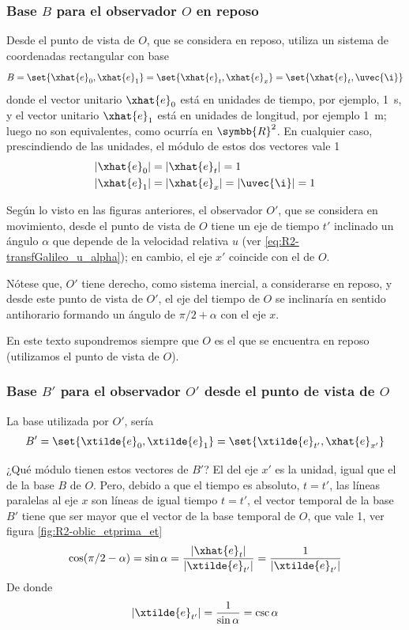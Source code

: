 \subsubsection{Base $B$ para el observador $O$ en reposo}
Desde el punto de vista de $O$, que se considera en reposo, utiliza un sistema de
coordenadas rectangular con base
\begin{equation}
  B
  = \set{\xhat{e}_0, \xhat{e}_1}
  = \set{\xhat{e}_t, \xhat{e}_x}
  = \set{\xhat{e}_t, \uvec{\i}}
\end{equation}
donde el vector unitario $\xhat{e}_0$ está en unidades de tiempo, por ejemplo,
\qty{1}{\second}, y el vector unitario $\xhat{e}_1$ está en unidades de longitud, por
ejemplo \qty{1}{\metre}; luego no son equivalentes, como ocurría en $\symbb{R}^2$.
En cualquier caso, prescindiendo de las unidades, el módulo de estos dos vectores vale 1
\begin{subequations}
\begin{align}
  |\xhat{e}_0| &= |\xhat{e}_t| = 1\\
  |\xhat{e}_1| &= |\xhat{e}_x| = |\uvec{\i}| = 1
\end{align}
\end{subequations}

Según lo visto en las figuras anteriores, el observador $O'$, que se considera en
movimiento, desde el punto de vista de $O$ tiene un eje de tiempo $t'$ inclinado un
ángulo $\alpha$ que depende de la velocidad relativa $u$
(ver \eqref{eq:R2-transfGalileo_u_alpha}); en cambio, el eje $x'$ coincide con el de
$O$.

Nótese que, $O'$ tiene derecho, como sistema inercial, a considerarse en reposo, y desde
este punto de vista de $O'$, el eje del tiempo de $O$ se inclinaría en sentido
antihorario formando un ángulo de $\pi/2+\alpha$ con el eje $x$.

En este texto supondremos siempre que $O$ es el que se encuentra en reposo (utilizamos
el punto de vista de $O$).

\subsubsection{Base $B'$ para el observador $O'$ desde el punto de vista de $O$}
La base utilizada por $O'$, sería
\begin{equation}
  B'
  = \set{\xtilde{e}_0, \xtilde{e}_1}
  = \set{\xtilde{e}_{t'}, \xhat{e}_{x'}}
\end{equation}

¿Qué módulo tienen estos vectores de $B'$? El del eje $x'$ es la unidad, igual que el
de la base $B$ de $O$. Pero, debido a que el tiempo es absoluto, $t=t'$, las líneas
paralelas al eje $x$ son líneas de igual tiempo $t=t'$, el vector temporal de la base $B'$ tiene
que ser mayor que el vector de la base temporal de $O$, que vale 1, ver figura
\ref{fig:R2-oblic_etprima_et}
\[
  \cos(\pi/2 - \alpha)
  = \sin\alpha
  = \dfrac{|\xhat{e}_t|}{|\xtilde{e}_{t'}|}
  = \dfrac{1}{|\xtilde{e}_{t'}|}
\]
De donde
\[
  |\xtilde{e}_{t'}| = \dfrac{1}{\sin\alpha} = \csc\alpha
\]

